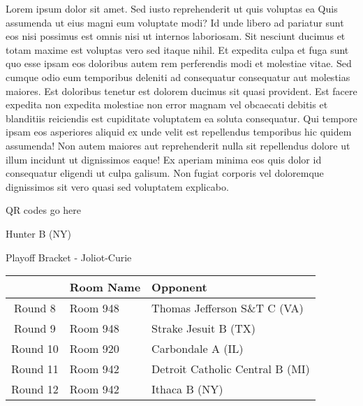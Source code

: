 \documentclass{article}%
\begin{document}
\vspace*{8pt}%
\linebreak%
\newline%
\newline%
Lorem ipsum dolor sit amet. Sed iusto reprehenderit ut quis voluptas ea Quis assumenda ut eius magni eum voluptate modi? Id unde libero ad pariatur sunt eos nisi possimus est omnis nisi ut internos laboriosam. Sit nesciunt ducimus et totam maxime est voluptas vero sed itaque nihil. Et expedita culpa et fuga sunt quo esse ipsam eos doloribus autem rem perferendis modi et molestiae vitae.\newline%
\newline%
Sed cumque odio eum temporibus deleniti ad consequatur consequatur aut molestias maiores. Est doloribus tenetur est dolorem ducimus sit quasi provident. Est facere expedita non expedita molestiae non error magnam vel obcaecati debitis et blanditiis reiciendis est cupiditate voluptatem ea soluta consequatur. Qui tempore ipsam eos asperiores aliquid ex unde velit est repellendus temporibus hic quidem assumenda!\newline%
\newline%
Non autem maiores aut reprehenderit nulla sit repellendus dolore ut illum incidunt ut dignissimos eaque! Ex aperiam minima eos quis dolor id consequatur eligendi ut culpa galisum. Non fugiat corporis vel doloremque dignissimos sit vero quasi sed voluptatem explicabo.\newline%
\newline%
%
\vspace*{30pt}%
\begin{center}%
\begin{Huge}%
QR codes go here%
\end{Huge}%
\end{center}%
\newpage%
\begin{center}%
\begin{Huge}%
Hunter B (NY)%
\end{Huge}%
\vspace*{8pt}%
\linebreak%
\begin{Large}%
Playoff Bracket {-} Joliot{-}Curie%
\end{Large}%
\end{center}%
%
\begin{tabularx}{\textwidth}{|c|Y|Y|}%
\hline%
&Room Name&Opponent\\%
\hline%
Round 8&Room 948&Thomas Jefferson S\&T C (VA)\\%
Round 9&Room 948&Strake Jesuit B (TX)\\%
Round 10&Room 920&Carbondale A (IL)\\%
Round 11&Room 942&Detroit Catholic Central B (MI)\\%
Round 12&Room 942&Ithaca B (NY)\\%
\hline%
\end{tabularx}%
\end{document}

